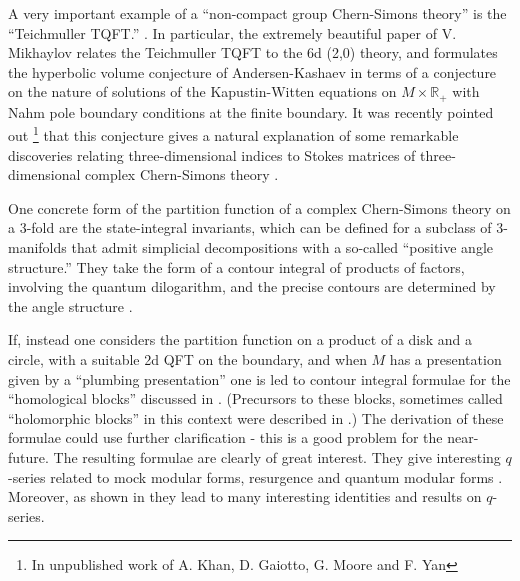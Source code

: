\documentclass[12pt]{article}
\begin{document}
A very important example of a 
``non-compact group Chern-Simons theory'' 
is the  ``Teichmuller TQFT.'' 
\cite{Andersen:2018pnw,
EllegaardAndersen:2011vps,
EllegaardAndersen:2013pze,
Mikhaylov:2017ngi,
Teschner:2005bz}. 
In particular, the extremely beautiful 
paper of V. Mikhaylov \cite{Mikhaylov:2017ngi} relates the Teichmuller 
TQFT to the 6d (2,0) theory, and formulates 
the hyperbolic volume conjecture of Andersen-Kashaev in terms of a conjecture on the nature of solutions of the Kapustin-Witten equations on $M \times \mathbb{R}_+$ with Nahm pole 
boundary conditions at the finite boundary. 
It was recently pointed out
%
\footnote{In unpublished work of A. Khan, D. Gaiotto, G. Moore and F. Yan} 
%
that this conjecture gives a natural explanation of some remarkable discoveries relating three-dimensional indices to Stokes matrices of three-dimensional complex Chern-Simons theory 
\cite{Garoufalidis:2020xec}.



One concrete form of the partition function of a complex Chern-Simons theory on a 3-fold are the state-integral invariants, which
can be defined for a 
subclass of 3-manifolds that admit simplicial decompositions with a so-called ``positive angle structure.'' They take the form of a contour integral of products of factors, involving the quantum dilogarithm, and the precise contours are determined by the angle structure
\cite{Andersen:2014aoa,Andersen:2015tma,
Dimofte:2009yn,
Dijkgraaf:2010ur,
Dimofte:2011gm, 
Dimofte:2014zga,
Dimofte:2015kkp,
Garoufalidis:2013axa,
Hikami:2006cv}.


If, instead one considers the partition function on a product of a 
disk and a circle, with a suitable 2d QFT on the boundary, and when $M$  
has a presentation given by a ``plumbing presentation'' one is led to contour integral formulae for the ``homological blocks''  discussed in  
\cite{Gukov:2016gkn,Gukov:2017kmk}. (Precursors to these blocks, sometimes called ``holomorphic blocks'' in this context were described in 
\cite{Beem:2012mb,Witten:2011zz}.)  
The derivation of these formulae could use 
further clarification - this is a good problem for the near-future. 
The resulting formulae are  clearly 
of great interest. They give interesting $q$-series related to mock modular forms, resurgence and quantum
modular forms \cite{Cheng:2018vpl}. Moreover, as shown in  \cite{Beem:2012mb} 
they lead to many interesting identities and results on $q$-series. 
\end{document}
